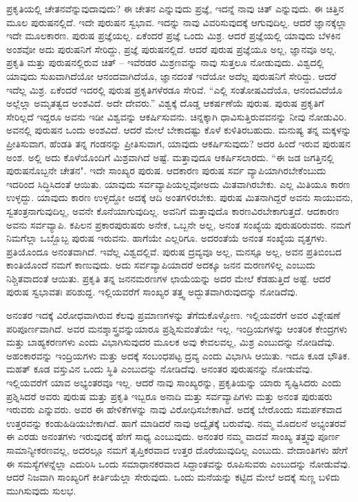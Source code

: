 ಪ್ರಕೃತಿಯಲ್ಲಿ ಚೇತನವೆನ್ನುವುದಾವುದು? ಈ ಚೇತನ ಎನ್ನುವುದು ಪ್ರಜ್ಞೆ, ಇದನ್ನೆ ನಾವು ಚಿತ್ ಎನ್ನುವುದು. ಈ ಚಿತ್ತಿನ ಮೂಲ ಪುರುಷನಲ್ಲಿದೆ. ಇದೇ ಪುರುಷನ ಸ್ವಭಾವ. ಇದನ್ನು ನಾವು ವಿವರಿಸುವುದಕ್ಕೆ ಆಗುವುದಿಲ್ಲ. ಆದರೆ ಜ್ಞಾನಕ್ಕೆಲ್ಲಾ ಇದೇ ಮೂಲಕಾರಣ. ಪುರುಷ ಪ್ರಜ್ಞೆಯಲ್ಲ. ಏಕೆಂದರೆ ಪ್ರಜ್ಞೆ ಒಂದು ಮಿಶ್ರ. ಆದರೆ ಪ್ರಜ್ಞೆಯಲ್ಲಿ ಯಾವುದು ಬೆಳಕಿನ ಅಂಶವೋ ಅದು ಪುರುಷನಿಗೆ ಸೇರಿದ್ದು, ಪ್ರಜ್ಞೆ ಪುರುಷನಲ್ಲಿದೆ. ಆದರೆ ಪುರುಷ ಪ್ರಜ್ಞೆಯೂ ಅಲ್ಲ, ಜ್ಞಾನವೂ ಅಲ್ಲ. ಪ್ರಕೃತಿ ಮತ್ತು ಪುರುಷನಲ್ಲಿರುವ ಚಿತ್ – ಇವೆರಡರ ಮಿಶ್ರಣವನ್ನು ನಾವು ಸುತ್ತಲೂ ನೋಡುವುದು. ವಿಶ್ವದಲ್ಲಿ ಯಾವುದು ಸುಖವಾಗಿದೆಯೋ ಆನಂದವಾಗಿದೆಯೊ, ಜ್ಞಾನದಂತೆ ಇದೆಯೋ ಅದೆಲ್ಲ ಪುರುಷನಿಗೆ ಸೇರಿದ್ದು. ಆದರೆ ಇದೆಲ್ಲ ಮಿಶ್ರ. ಏಕೆಂದರೆ ಇದರಲ್ಲಿ ಪುರುಷ ಪ್ರಕೃತಿಗಳೆರಡೂ ಸೇರಿವೆ. “ಎಲ್ಲಿ ಸಂತೋಷವಿದೆಯೊ, ಆನಂದವಿದೆಯೊ ಅಲ್ಲೆಲ್ಲಾ ಅಮೃತತ್ವದ ಅಂಶವಿದೆ. ಅದೇ ದೇವರು.'' ವಿಶ್ವಕ್ಕೆ ದೊಡ್ಡ ಆಕರ್ಷಣೆಯೆ ಪುರುಷ. ಪುರುಷ ಪ್ರಕೃತಿಗೆ ಸೇರಿಲ್ಲದೆ ಇದ್ದರೂ ಅವನು ಇಡೀ ವಿಶ್ವವನ್ನು ಆಕರ್ಷಿಸುವನು. ಚಿನ್ನಕ್ಕಾಗಿ ಧಾವಿಸುತ್ತಿರುವವನನ್ನು ನೀವು ನೋಡುವಿರಿ. ಅವನಲ್ಲಿ ಪುರುಷನ ಒಂದು ಅಂಶವಿದೆ. ಆದರೆ ಮೇಲೆ ಬೇಕಾದಷ್ಟು ಕೊಳೆ ಕುಳಿತಿರಬಹುದು. ಮನುಷ್ಯ ತನ್ನ ಮಕ್ಕಳನ್ನು ಪ್ರೀತಿಸುವಾಗ, ಹೆಂಡತಿ ತನ್ನ ಗಂಡನನ್ನು ಪ್ರೀತಿಸುವಾಗ, ಯಾವುದು ಆಕರ್ಷಿಸುವುದು? ಅದರ ಹಿಂದೆ ಇರುವ ಪುರುಷನ ಅಂಶ. ಅಲ್ಲಿ ಅದು ಕೊಳೆಯೊಂದಿಗೆ ಮಿಶ್ರವಾಗಿದೆ ಅಷ್ಟೆ. ಮತ್ತಾವುದೂ ಆಕರ್ಷಿಸಲಾರದು. “ಈ ಜಡ ಜಗತ್ತಿನಲ್ಲಿ ಪುರುಷನೊಬ್ಬನೇ ಚೇತನ". ಇದೇ ಸಾಂಖ್ಯರ ಪುರುಷ. ಆದಕಾರಣ ಪುರುಷ ಸರ್ವ ವ್ಯಾಪಿಯಾಗಿರಬೇಕೆಂಬುದು ಇದರಿಂದ ಸಿದ್ಧಿಸಿದಂತೆ ಆಯಿತು. ಯಾವುದು ಸರ್ವವ್ಯಾಪಿಯಲ್ಲವೋ\break ಅದು ಮಿತವಾಗಿರಬೇಕು. ಎಲ್ಲ ಮಿತಿಯೂ ಕಾರಣ ಉಳ್ಳದ್ದು. ಯಾವುದು ಕಾರಣ ಉಳ್ಳದ್ದೋ ಅದಕ್ಕೆ ಆದಿ ಅಂತಗಳಿರಬೇಕು. ಪುರುಷ ಮಿತನಾಗಿದ್ದರೆ ಅವನು ಸಾಯುವನು, ಸ್ವತಂತ್ರನಾಗುವುದಿಲ್ಲ, ಅವನೇ ಕೊನೆಯಾಗುವುದಿಲ್ಲ. ಅವನಿಗೆ ಮತ್ತಾವುದೊ ಕಾರಣವಿರಬೇಕಾಗುತ್ತದೆ. ಆದಕಾರಣ ಅವನು ಸರ್ವವ್ಯಾಪಿ. ಕಪಿಲನ ಪ್ರಕಾರ\break ಪುರುಷರು ಅನೇಕ, ಒಬ್ಬನೇ ಅಲ್ಲ, ಅನಂತ ಸಂಖ್ಯೆಯ ಪುರುಷರಿರುವರು. ನಮಗೆ ನಿಮಗೆಲ್ಲಾ ಒಬ್ಬೊಬ್ಬ ಪುರುಷ ಇರುವನು. ಹಾಗೆಯೇ ಎಲ್ಲರಿಗೂ. ಅದರಂತೆಯೆ ಅನಂತ ಸಂಖ್ಯೆಯ ವೃತ್ತಗಳು. ಪ್ರತಿಯೊಂದೂ ಅನಂತವಾಗಿದೆ. ಇವೆಲ್ಲ ವಿಶ್ವದಲ್ಲಿವೆ. ಪುರುಷ ದ್ರವ್ಯವೂ ಅಲ್ಲ, ಮನಸ್ಸೂ ಅಲ್ಲ, ಅವನ ಪ್ರತಿಬಿಂಬದ ಕಾಂತಿಯೊಂದೆ ನಮಗೆ ಕಾಣುವುದು. ಅದು ಸರ್ವವ್ಯಾಪಿಯಾದರೆ ಅದಕ್ಕೂ ಜನನ ಮರಣಗಳಿಲ್ಲ ಎಂಬುದು ನಿಶ್ಚಿತವಾದಂತೆ ಆಯಿತು. ಪ್ರಕೃತಿ ತನ್ನ ಜನನಮರಣಗಳ ಛಾಯೆಯನ್ನು ಅದರ ಮೇಲೆ ಕೆಡಹುತ್ತಿದೆ ಅಷ್ಟೆ. ಆದರೆ ಪುರುಷ ಸ್ವಭಾವತಃ ಪರಿಶುದ್ದ. ಇಲ್ಲಿಯವರೆಗೆ ಸಾಂಖ್ಯರ ತತ್ತ್ವ ಅದ್ಭುತವಾಗಿರುವುದನ್ನು ನೋಡಿದೆವು.

ಅನಂತರ ಇದಕ್ಕೆ ವಿರೋಧವಾಗಿರುವ ಕೆಲವು ಪ್ರಮಾಣಗಳನ್ನು ತೆಗೆದುಕೊಳ್ಳೋಣ. ಇಲ್ಲಿಯವರೆಗೆ ಅವರ ವಿಶ್ಲೇಷಣೆ ಪರಿಪೂರ್ಣವಾಗಿದೆ. ಅವರ ಮನಶ್ಶಾಸ್ತ್ರವನ್ನು\break ಯಾರೂ ಪ್ರಶ್ನಿಸುವಂತೆಯೇ ಇಲ್ಲ. ಇಂದ್ರಿಯಗಳನ್ನು ಆಂತರಿಕ ಕೇಂದ್ರಗಳು ಮತ್ತು ಬಾಹ್ಯಕರಣಗಳು ಎಂದು ವಿಭಾಗಿಸುವುದರ ಮೂಲಕ ಅವು ಕೇವಲವಲ್ಲ, ಮಿಶ್ರ ಎಂಬುದನ್ನು ನೋಡಿದೆವು. ಅಹಂಕಾರವನ್ನು ಇಂದ್ರಿಯಗಳು ಮತ್ತು ಅದಕ್ಕೆ ಸಂಬಂಧಪಟ್ಟ ದ್ರವ್ಯ ಎಂದು ವಿಭಾಗಿಸಿ ಆಯಿತು. ಇದೂ ಕೂಡ ಭೌತಿಕ. ಮಹತ್ ಕೂಡ ವಸ್ತುವಿನ ಒಂದು ಸ್ಥಿತಿ ಎಂಬುದನ್ನು ನೋಡಿದೆವು. ಅನಂತರ ಪುರುಷನನ್ನು ನೋಡುವೆವು. ಇಲ್ಲಿಯವರೆಗೆ ಯಾವ ಅಭ್ಯಂತರವೂ ಇಲ್ಲ. ಆದರೆ ನಾವು ಸಾಂಖ್ಯರನ್ನು, ಪ್ರಕೃತಿಯನ್ನು ಯಾರು ಸೃಷ್ಟಿಸಿದರು ಎಂದು ಪ್ರಶ್ನಿಸಿದರೆ ಅವರು ಪುರುಷ ಮತ್ತು ಪ್ರಕೃತಿ ಇಬ್ಬರೂ ಅನಾದಿ ಮತ್ತು ಸರ್ವವ್ಯಾಪಿಗಳು ಮತ್ತು ಅನಂತ ಪುರುಷರು ಇರುವರು ಎನ್ನುವರು. ಅವರ ಈ ಹೇಳಿಕೆಗಳನ್ನು ನಾವು ವಿರೋಧಿಸಬೇಕಾಗಿದೆ. ಅದಕ್ಕೆ ಬೇರೊಂದು ಸಮರ್ಪಕವಾದ ಉತ್ತರವನ್ನು ಕಂಡುಹಿಡಿಯಬೇಕಾಗಿದೆ. ಹಾಗೆ ಮಾಡಿದರೆ ನಾವು ಅದ್ವೈತಕ್ಕೆ ಬರುವೆವು. ನಮ್ಮ ಮೊದಲನೆ ಅಭ್ಯಂತರವೆ ಈ ಎರಡು ಅನಂತಗಳು ಇರುವುದಕ್ಕೆ ಹೇಗೆ ಸಾಧ್ಯ ಎಂಬುವುದು. ಅನಂತರ ನಮ್ಮ ವಾದವೆ ಸಾಂಖ್ಯ ತತ್ತ್ವವು ಪೂರ್ಣ ಸಾಮಾನ್ಯೀಕರಣವಲ್ಲ, ಅದರಲ್ಲೂ ನಮಗೆ ತೃಪ್ತಿಕರವಾದ ಉತ್ತರ ದೊರೆಯುವುದಿಲ್ಲ ಎಂಬುದು. ವೇದಾಂತಿಗಳು ಹೇಗೆ ಈ ಸಮಸ್ಯೆಗಳನ್ನೆಲ್ಲಾ ಎದುರಿಸಿ ಒಂದು ಸಮಾಧಾನಕರವಾದ ಸಿದ್ದಾಂತವನ್ನು ರೂಪಿಸುವರು ಎಂಬುದನ್ನು ನೋಡುವೆವು. ಆದರೆ ನಿಜವಾಗಿ ಸಾಂಖ್ಯರಿಗೆ ಕೀರ್ತಿಯೆಲ್ಲಾ ಸೇರುವುದು. ಒಂದು ಮನೆಯನ್ನು ಕಟ್ಟಿದ ಮೇಲೆ ಅದಕ್ಕೆ ಸುಣ್ಣ ಬಳಿದು ಮುಗಿಸುವುದು ಸುಲಭ.

